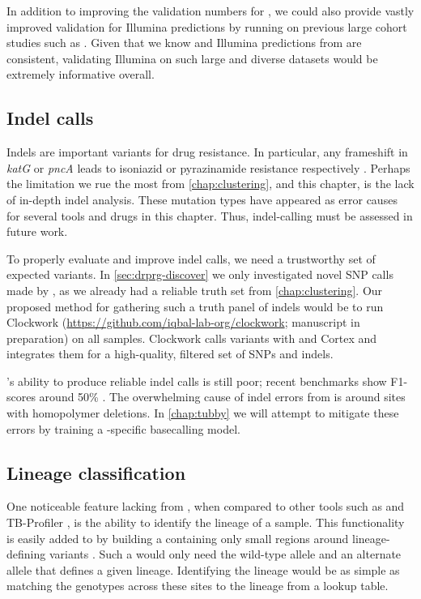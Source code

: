 In addition to improving the validation numbers for \ont{}, we could also provide vastly improved validation for \drprg{} Illumina predictions by running on previous large cohort studies such as \cite{cryptic2018,hunt2019,phelan2019}. Given that we know \ont{} and Illumina predictions from \drprg{} are consistent, validating Illumina on such large and diverse datasets would be extremely informative overall.

\subsection{Indel calls}
\label{sec:indel-dst-fw}
Indels are important variants for \mtb{} drug resistance. In particular, any frameshift in \textit{katG} or \textit{pncA} leads to isoniazid or pyrazinamide resistance respectively \cite{miotto2017}. Perhaps the limitation we rue the most from \autoref{chap:clustering}, and this chapter, is the lack of in-depth indel analysis. These mutation types have appeared as error causes for several tools and drugs in this chapter. Thus, indel-calling must be assessed in future work.

To properly evaluate and improve indel calls, we need a trustworthy set of expected variants. In \autoref{sec:drprg-discover} we only investigated novel SNP calls made by \drprg{}, as we already had a reliable truth set from \autoref{chap:clustering}. Our proposed method for gathering such a truth panel of indels would be to run Clockwork (\url{https://github.com/iqbal-lab-org/clockwork}; manuscript in preparation) on all samples. Clockwork calls variants with  and Cortex and integrates them for a high-quality, filtered set of SNPs and indels.

\ont{}'s ability to produce reliable indel calls is still poor; recent benchmarks show F1-scores around 50\% \cite{clairvoyant2019}. The overwhelming cause of indel errors from \ont{} is around sites with homopolymer deletions. In \autoref{chap:tubby} we will attempt to mitigate these errors by training a \mtb{}-specific \ont{} basecalling model.

\subsection{Lineage classification}

One noticeable feature lacking from \drprg{}, when compared to other tools such as \mykrobe{} and TB-Profiler \cite{phelan2019}, is the ability to identify the lineage of a sample. This functionality is easily added to \drprg{} by building a \panrg{} containing only small regions around lineage-defining variants \cite{Shitikov2017,Rutaihwa2019,stucki2016,Freschi2020}. Such a \panrg{} would only need the wild-type allele and an alternate allele that defines a given lineage. Identifying the lineage would be as simple as matching the genotypes across these sites to the lineage from a lookup table.

